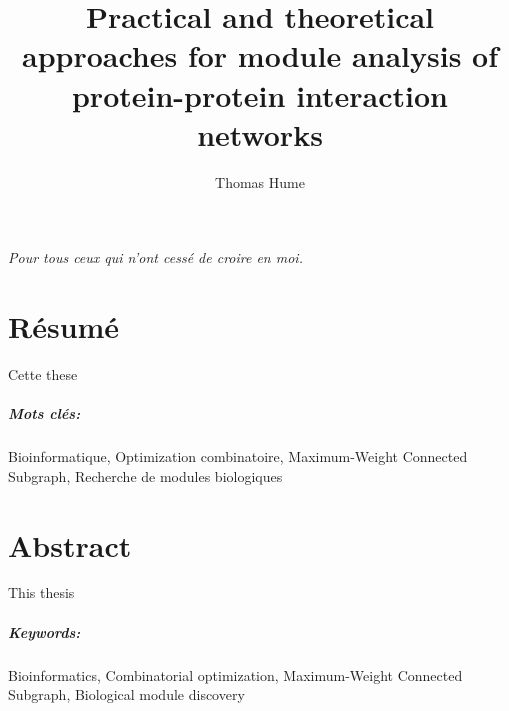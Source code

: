 \documentclass[11pt,a4paper,twoside]{memoir}
\title{Practical and theoretical approaches for module analysis of protein-protein interaction networks}
\author{Thomas Hume}
\begin{document}

\thispagestyle{empty}
\clearpage

\frontmatter

\vphantom{foobar} \vphantom{foobar} \vphantom{foobar} \vphantom{foobar} \vphantom{foobar} \vphantom{foobar} \vphantom{foobar} \vphantom{foobar}
\hspace{\fill}\emph{Pour tous ceux qui n'ont cessé de croire en moi.}
\thispagestyle{empty}


\chapter*{Résumé}

	Cette these 

\paragraph{Mots clés:}Bioinformatique, Optimization combinatoire, Maximum-Weight Connected Subgraph, Recherche de modules biologiques

\clearpage

\chapter*{Abstract}

	This thesis

\paragraph{Keywords:}Bioinformatics, Combinatorial optimization, Maximum-Weight Connected Subgraph, Biological module discovery

\cleardoublepage


 \tableofcontents*
 \cleardoublepage

 \listoffigures*
 \cleardoublepage

 \listoftables*

\mainmatter


\end{document}
